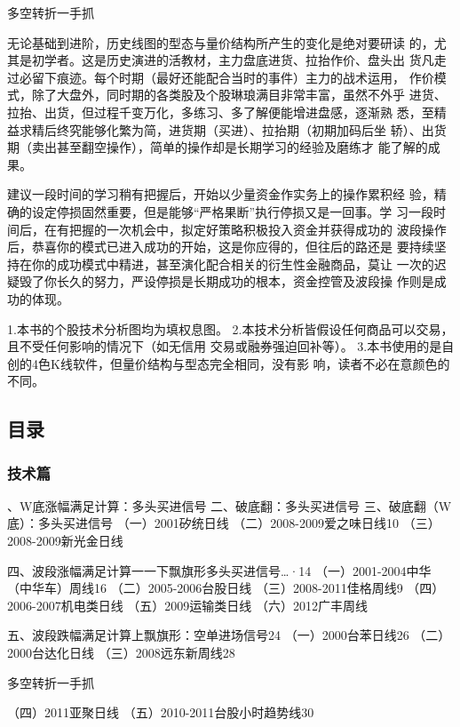 \documentclass{article}
\begin{document}
\clearpage

多空转折一手抓

无论基础到进阶，历史线图的型态与量价结构所产生的变化是绝对要研读 的，尤其是初学者。这是历史演进的活教材，主力盘底进货、拉抬作价、盘头出 货凡走过必留下痕迹。每个时期（最好还能配合当时的事件）主力的战术运用， 作价模式，除了大盘外，同时期的各类股及个股琳琅满目非常丰富，虽然不外乎 进货、拉抬、出货，但过程千变万化，多练习、多了解便能增进盘感，逐渐熟 悉，至精益求精后终究能够化繁为简，进货期（买进）、拉抬期（初期加码后坐 轿）、出货期（卖出甚至翻空操作），简单的操作却是长期学习的经验及磨练才 能了解的成果。

建议一段时间的学习稍有把握后，开始以少量资金作实务上的操作累积经 验，精确的设定停损固然重要，但是能够“严格果断”执行停损又是一回事。学 习一段时间后，在有把握的一次机会中，拟定好策略积极投入资金并获得成功的 波段操作后，恭喜你的模式已进入成功的开始，这是你应得的，但往后的路还是 要持续坚持在你的成功模式中精进，甚至演化配合相关的衍生性金融商品，莫让 一次的迟疑毁了你长久的努力，严设停损是长期成功的根本，资金控管及波段操 作则是成功的体现。

1.本书的个股技术分析图均为填权息图。 2.本技术分析皆假设任何商品可以交易，且不受任何影响的情况下（如无信用 交易或融券强迫回补等）。 3.本书使用的是自创的4色K线软件，但量价结构与型态完全相同，没有影 响，读者不必在意颜色的不同。

\clearpage

\subsection{目录}

\subsubsection{技术篇}

、W底涨幅满足计算：多头买进信号 二、破底翻：多头买进信号 三、破底翻（W底）：多头买进信号 （一）2001矽统日线 （二）2008-2009爱之味日线10 （三）2008-2009新光金日线

四、波段涨幅满足计算一一下飘旗形多头买进信号…·14 （一）2001-2004中华（中华车）周线16 （二）2005-2006台股日线 （三）2008-2011佳格周线9 （四）2006-2007机电类日线 （五）2009运输类日线 （六）2012广丰周线

五、波段跌幅满足计算上飘旗形：空单进场信号24 （一）2000台苯日线26 （二）2000台达化日线 （三）2008远东新周线28

\clearpage

多空转折一手抓

（四）2011亚聚日线 （五）2010-2011台股小时趋势线30
\end{document}
